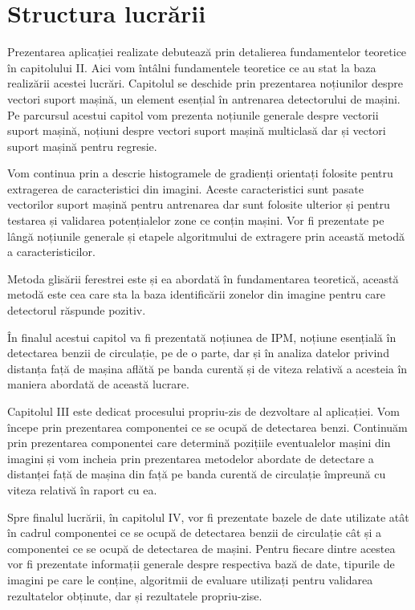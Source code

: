 \section{Structura lucrării}

Prezentarea aplicației realizate debutează prin detalierea fundamentelor teoretice în capitolului II. Aici vom întâlni fundamentele teoretice ce au stat la baza realizării acestei lucrări. Capitolul se deschide prin prezentarea noțiunilor despre vectori suport mașină, un element esențial în antrenarea detectorului de mașini. Pe parcursul acestui capitol vom prezenta noțiunile generale despre vectorii suport mașină, noțiuni despre vectori suport mașină multiclasă dar și vectori suport mașină pentru regresie. 

Vom continua prin a descrie histogramele de gradienți orientați folosite pentru extragerea de caracteristici din imagini. Aceste caracteristici sunt pasate vectorilor suport mașină pentru antrenarea dar sunt folosite ulterior și pentru testarea și validarea potențialelor zone ce conțin mașini. Vor fi prezentate pe lângă noțiunile generale și etapele algoritmului de extragere prin această metodă a caracteristicilor. 

Metoda glisării ferestrei este și ea abordată în fundamentarea teoretică, această metodă este cea care sta la baza identificării zonelor din imagine pentru care detectorul răspunde pozitiv. 

În finalul acestui capitol va fi prezentată noțiunea de IPM, noțiune esențială în detectarea benzii de circulație, pe de o parte, dar și în analiza datelor privind distanța față de mașina aflătă pe banda curentă și de viteza relativă a acesteia în maniera abordată de această lucrare.

Capitolul III este dedicat procesului propriu-zis de dezvoltare al aplicației. Vom începe prin prezentarea componentei ce se ocupă de detectarea benzi. Continuăm prin prezentarea componentei care determină pozițiile eventualelor mașini din imagini și vom incheia prin prezentarea metodelor abordate de detectare a distanței față de mașina din față pe banda curentă de circulație împreună cu viteza relativă în raport cu ea.

Spre finalul lucrării, în capitolul IV, vor fi prezentate bazele de date utilizate atât în cadrul componentei ce se ocupă de detectarea benzii de circulație cât și a componentei ce se ocupă de detectarea de mașini. Pentru fiecare dintre acestea vor fi prezentate informații generale despre respectiva bază de date, tipurile de imagini pe care le conține, algoritmii de evaluare utilizați pentru validarea rezultatelor obținute, dar și rezultatele propriu-zise.

